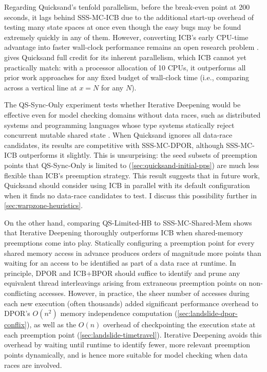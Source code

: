 Regarding Quicksand's tenfold parallelism,
before the break-even point at 200 seconds,
it lags behind SSS-MC-ICB due to the additional start-up overhead
of testing many state spaces at once even though the easy bugs may be found extremely quickly in any of them.
However, converting ICB's early CPU-time advantage
into faster wall-clock performance remains an open research problem \cite{parallel-dpor}.
 gives Quicksand full credit for its inherent parallelism,
which ICB cannot yet practically match:
with a processor allocation of 10 CPUs, it outperforms all prior work approaches
for any fixed budget of wall-clock time
(i.e., comparing across a vertical line at $x=N$ for any $N$).

The QS-Sync-Only experiment tests whether Iterative Deepening would be effective
even for model checking domains without data races,
such as distributed systems \cite{macemc,modist,samc,dbug-retreat,concuerror}
and programming languages whose type systems statically reject concurrent mutable shared state
\cite{erlang,haskell,rust-book}.
When Quicksand ignores all data-race candidates,
its results are competitive with SSS-MC-DPOR, although SSS-MC-ICB outperforms it slightly.
This is unsurprising: the seed subsets of preemption points
that QS-Sync-Only is limited to
(\cref{sec:quicksand-initial-pps})
are much less flexible than ICB's preemption strategy.
This result suggests that in future work,
Quicksand should consider using ICB in parallel with its default configuration when it finds no data-race candidates to test.
I discuss this possibility further in \cref{sec:warpzone-heuristics}.

On the other hand,
comparing QS-Limited-HB to SSS-MC-Shared-Mem
shows that Iterative Deepening thoroughly outperforms ICB when shared-memory preemptions come into play.
Statically configuring a preemption point for every shared memory access in advance
produces orders of magnitude more points than
waiting for an access to be identified as part of a data race at runtime.
%
In principle, DPOR and ICB+BPOR should suffice to identify and prune any equivalent thread interleavings
arising from extraneous preemption points on non-conflicting accesses.
However, in practice,
the sheer number of accesses during each new execution
(often thousands)
added significant performance overhead to
DPOR's $O(n^2)$ memory independence computation (\cref{sec:landslide-dpor-conflix}),
as well as the $O(n)$ overhead of checkpointing the execution state at each preemption point (\cref{sec:landslide-timetravel}).
Iterative Deepening avoids this overhead by waiting until runtime
to identify fewer, more relevant preemption points dynamically,
and is hence more suitable for model checking when data races are involved.

